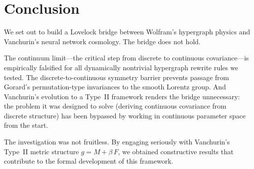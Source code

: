 \documentclass[11pt]{article}
\theoremstyle{definition}
\theoremstyle{remark}
\begin{document}
\section{Conclusion}
\label{sec:conclusion}

We set out to build a Lovelock bridge between Wolfram's hypergraph
physics and Vanchurin's neural network cosmology.
The bridge does not hold.

The continuum limit---the critical step from discrete to continuous
covariance---is empirically falsified for all dynamically nontrivial
hypergraph rewrite rules we tested.
The discrete-to-continuous symmetry barrier prevents passage from
Gorard's permutation-type invariances to the smooth Lorentz group.
And Vanchurin's evolution to a Type~II framework renders the bridge
unnecessary: the problem it was designed to solve (deriving continuous
covariance from discrete structure) has been bypassed by working in
continuous parameter space from the start.

The investigation was not fruitless.
By engaging seriously with Vanchurin's Type~II metric structure
$g = M + \beta\,F$, we obtained constructive results that contribute
to the formal development of this framework.
\end{document}
